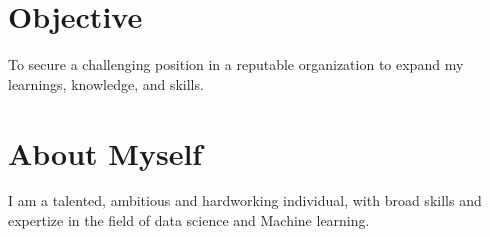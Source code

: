 \documentclass[letterpaper]{twentysecondcv} %
\begin{document}

\makeprofile %



%
\section{Objective}
\newline
\newline
To secure a challenging position in a reputable organization to expand my learnings, knowledge, and skills.

\section{About Myself}
\newline
\newline
I am a talented, ambitious and hardworking individual, with broad skills and expertize in the field of data science and Machine learning.
\end{document}
